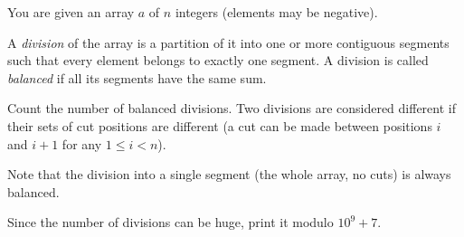 You are given an array $a$ of $n$ integers (elements may be negative).

A \emph{division} of the array is a partition of it into one or more contiguous segments such that every element belongs to exactly one segment. A division is called \emph{balanced} if all its segments have the same sum.

Count the number of balanced divisions. Two divisions are considered different if their sets of cut positions are different (a cut can be made between positions $i$ and $i+1$ for any $1 \le i < n$).

Note that the division into a single segment (the whole array, no cuts) is always balanced.

Since the number of divisions can be huge, print it modulo $10^9 + 7$.
